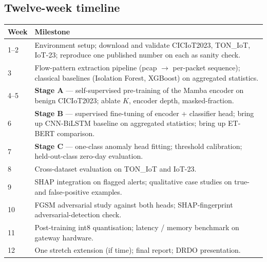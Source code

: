 \documentclass[11pt,a4paper]{article}
\begin{document}
\subsection{Twelve-week timeline}
\begin{center}
\begin{tabularx}{\linewidth}{@{}lX@{}}
\toprule
\textbf{Week} & \textbf{Milestone} \\
\midrule
1--2  & Environment setup; download and validate CICIoT2023, TON\_IoT, IoT-23; reproduce one published number on each as sanity check. \\
3     & Flow-pattern extraction pipeline (pcap $\to$ per-packet sequence); classical baselines (Isolation Forest, XGBoost) on aggregated statistics. \\
4--5  & \textbf{Stage A} --- self-supervised pre-training of the Mamba encoder on benign CICIoT2023; ablate $K$, encoder depth, masked-fraction. \\
6     & \textbf{Stage B} --- supervised fine-tuning of encoder + classifier head; bring up CNN-BiLSTM baseline on aggregated statistics; bring up ET-BERT comparison. \\
7     & \textbf{Stage C} --- one-class anomaly head fitting; threshold calibration; held-out-class zero-day evaluation. \\
8     & Cross-dataset evaluation on TON\_IoT and IoT-23. \\
9     & SHAP integration on flagged alerts; qualitative case studies on true- and false-positive examples. \\
10    & FGSM adversarial study against both heads; SHAP-fingerprint adversarial-detection check. \\
11    & Post-training int8 quantisation; latency / memory benchmark on gateway hardware. \\
12    & One stretch extension (if time); final report; DRDO presentation. \\
\bottomrule
\end{tabularx}
\end{center}
\end{document}
